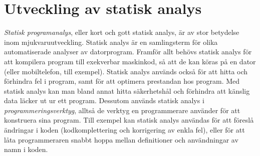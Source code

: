 \documentclass[10pt, twoside, openright]{book}
\begin{document}
\makeatletter
\def\@makeschapterhead#1{%
  \vspace*{10\p@}%
  {\parindent \z@ \raggedleft \reset@font
            \sffamily \bfseries \scshape \vphantom{\@chapapp{} \thechapter}
        \par\nobreak
        \interlinepenalty\@M
    \Huge  #1\par\nobreak
    \hrulefill
    \par\nobreak
    \vskip 16\p@
  }}
\makeatother

\chapter*{Utveckling av statisk analys}

\emph{Statisk programanalys}, eller kort och gott statisk analys,
är av stor betydelse inom mjukvaruutveckling.
Statisk analys är en samlingsterm för olika automatiserade analyser av datorprogram.
Framför allt behövs statisk analys för att kompilera program till exekverbar maskinkod,
så att de kan köras på en dator (eller mobiltelefon, till exempel).
Statisk analys används också för att hitta och förhindra fel i program,
samt för att optimera prestandan hos program.
Med statisk analys kan man bland annat hitta säkerhetshål och förhindra att känslig data läcker ut ur
ett program.
Dessutom används statisk analys i \emph{programmeringsverktyg}, alltså de verktyg en programmerare
använder för att konstruera sina program. Till exempel kan statisk analys användas för att
föreslå ändringar i koden (kodkomplettering och korrigering av enkla fel),
eller för att låta programmeraren snabbt hoppa mellan definitioner och användningar av
namn i koden.
\end{document}
